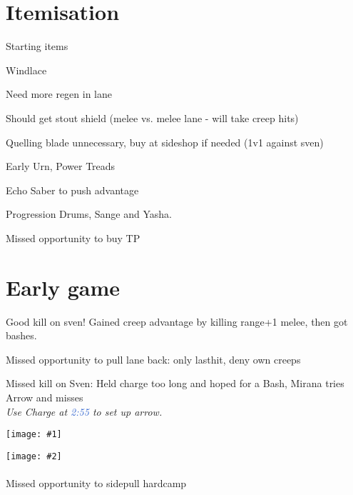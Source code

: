 \documentclass{article}
\newcommand{\gt}{\ensuremath{\;\;\color{green} \filledmedtriangleup} }
\newcommand{\rt}{\ensuremath{\;\;\color{red} \filledmedtriangledown} }
\newcommand{\ws}{\ensuremath{\;\;\color{white} \filledmedsquare} }
\newenvironment{remarks}
    {
        \begin{description}
            \setlength\itemsep{0em}
    }
    {
        \end{description}
    }
\newcommand{\goodremark}[1]{\item[\gt] #1}
\newcommand{\neutralremark}[1]{\item[\ws] #1}
\newcommand{\badremark}[1]{\item[\rt] #1}
\newcommand{\logremark}[2]{\item[\textnormal{\logref{#1}}] #2}
\newcommand{\suggestion}[1]{\\ \emph{#1}}
\newcommand{\logref}[1]{\textcolor{highlight}{#1}}
\newcommand{\twoscreenshots}[2]{
\begin{center}
    \begin{minipage}[t]{0.4\textwidth}
        \begin{center}
            \texttt{[image: \#1]}
            \end{center}
    \end{minipage}
    \begin{minipage}[t]{0.4\textwidth}
            \begin{center}
        \texttt{[image: \#2]}
                \paragraph{}\hfill
            \end{center}
    \end{minipage}
\end{center}
}
\begin{document}
\pagebreak

\section{Itemisation}

\begin{remarks}
\neutralremark{Starting items
\begin{remarks}
\goodremark{Windlace}
\badremark{Need more regen in lane}
\badremark{Should get stout shield (melee vs. melee lane - will take creep hits)}
\badremark{Quelling blade unnecessary, buy at sideshop if needed (1v1 against sven)}
\end{remarks}
    }
\goodremark{Early Urn, Power Treads}
\goodremark{Echo Saber to push advantage}
\neutralremark{Progression Drums, Sange and Yasha.}

\logremark{19:05} {Missed opportunity to buy TP}
\end{remarks}


\section{Early game}

    
\begin{remarks}

    \logremark{1:53}{Good kill on sven! Gained creep advantage by killing range+1 melee, then got bashes.}
    \logremark{1:58}{Missed opportunity to pull lane back: 
    only lasthit, deny own creeps}
    \logremark{2:58}{Missed kill on Sven: Held charge too long and hoped for a Bash, Mirana tries Arrow and misses
    \suggestion{Use Charge at \logref{2:55} to set up arrow.}\twoscreenshots{img/255.jpg}{img/257.jpg}}
    \logremark{3:20}{Missed opportunity to sidepull hardcamp}
   
\end{remarks}

\pagebreak
\end{document}
